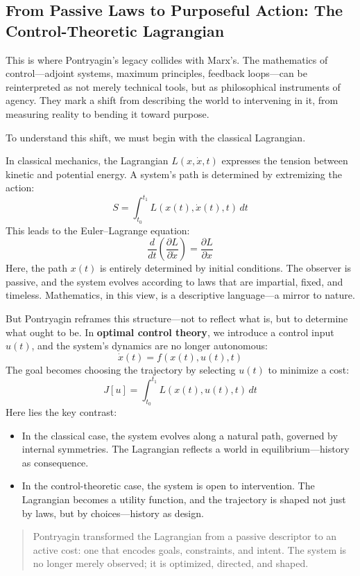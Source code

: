 \subsection{From Passive Laws to Purposeful Action: The Control-Theoretic Lagrangian}

This is where Pontryagin’s legacy collides with Marx’s. The mathematics of control—adjoint systems, maximum principles, feedback loops—can be reinterpreted as not merely technical tools, but as philosophical instruments of agency. They mark a shift from describing the world to intervening in it, from measuring reality to bending it toward purpose.

To understand this shift, we must begin with the classical Lagrangian.

In classical mechanics, the Lagrangian \( L(x, \dot{x}, t) \) expresses the tension between kinetic and potential energy. A system’s path is determined by extremizing the action:
\[
S = \int_{t_0}^{t_1} L(x(t), \dot{x}(t), t) \, dt
\]
This leads to the Euler–Lagrange equation:
\[
\frac{d}{dt} \left( \frac{\partial L}{\partial \dot{x}} \right) = \frac{\partial L}{\partial x}
\]
Here, the path \( x(t) \) is entirely determined by initial conditions. The observer is passive, and the system evolves according to laws that are impartial, fixed, and timeless. Mathematics, in this view, is a descriptive language—a mirror to nature.

But Pontryagin reframes this structure—not to reflect what is, but to determine what ought to be. In \textbf{optimal control theory}, we introduce a control input \( u(t) \), and the system’s dynamics are no longer autonomous:
\[
\dot{x}(t) = f(x(t), u(t), t)
\]
The goal becomes choosing the trajectory by selecting \( u(t) \) to minimize a cost:
\[
J[u] = \int_{t_0}^{t_1} L(x(t), u(t), t) \, dt
\]
Here lies the key contrast:

\begin{itemize}
  \item In the classical case, the system evolves along a natural path, governed by internal symmetries. The Lagrangian reflects a world in equilibrium—history as consequence.
  \item In the control-theoretic case, the system is open to intervention. The Lagrangian becomes a utility function, and the trajectory is shaped not just by laws, but by choices—history as design.
\end{itemize}

\begin{quote}
Pontryagin transformed the Lagrangian from a passive descriptor to an active cost: one that encodes goals, constraints, and intent. The system is no longer merely observed; it is optimized, directed, and shaped.
\end{quote}


